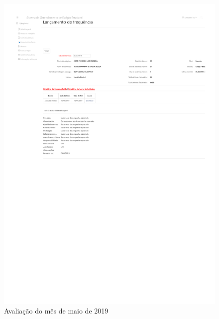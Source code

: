 \begin{anexosenv}
\begin{figure}
    \centering
    \includegraphics[trim=100 410 0 140, clip, width=\textwidth]{anexos/avaliacao201905}
    \caption{Avaliação do mês de maio de 2019}
    \label{fig:avaliacao201905}
\end{figure}


\end{anexosenv}
